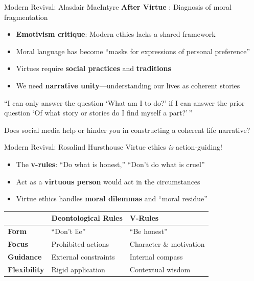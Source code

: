 ﻿\documentclass[aspectratio=169,11pt]{beamer}
\begin{document}
\begin{frame}{Modern Revival: Alasdair MacIntyre}
\textbf{After Virtue} \parencite{macintyre_after_virtue}: Diagnosis of moral fragmentation

\begin{itemize}
    \item \textbf{Emotivism critique}: Modern ethics lacks a shared framework
    \item Moral language has become ``masks for expressions of personal preference''
    \item Virtues require \textbf{social practices} and \textbf{traditions}
    \item We need \textbf{narrative unity}---understanding our lives as coherent stories
\end{itemize}

\vspace{0.3cm}
\begin{quotebox}
``I can only answer the question `What am I to do?' if I can answer the prior question `Of what story or stories do I find myself a part?'\,''
\end{quotebox}

\begin{discussionbox}[Discussion]
Does social media help or hinder you in constructing a coherent life narrative?
\end{discussionbox}
\end{frame}

\begin{frame}{Modern Revival: Rosalind Hursthouse}
Virtue ethics \textit{is} action-guiding!

\begin{itemize}
    \item The \textbf{v-rules}: ``Do what is honest,'' ``Don't do what is cruel''
    \item Act as a \textbf{virtuous person} would act in the circumstances
    \item Virtue ethics handles \textbf{moral dilemmas} and ``moral residue''
\end{itemize}

\vspace{0.3cm}
\begin{table}[h]
\centering
\small
\begin{tabular}{>{\bfseries}l l l}
\toprule
& \textbf{Deontological Rules} & \textbf{V-Rules} \\
\midrule
Form & ``Don't lie'' & ``Be honest'' \\
Focus & Prohibited actions & Character \& motivation \\
Guidance & External constraints & Internal compass \\
Flexibility & Rigid application & Contextual wisdom \\
\bottomrule
\end{tabular}
\end{table}
\end{frame}
\end{document}

